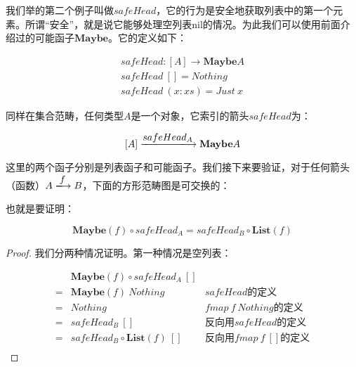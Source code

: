 \documentclass{article}
\begin{document}
\begin{example}
我们举的第二个例子叫做$safeHead$，它的行为是安全地获取列表中的第一个元素。所谓“安全”，就是说它能够处理空列表nil的情况。为此我们可以使用前面介绍过的可能函子$\mathbf{Maybe}$。它的定义如下：

\[
\begin{array}{l}
safeHead : [A] \to \mathbf{Maybe} A \\
safeHead\ [] = Nothing \\
safeHead\ (x:xs) = Just\ x
\end{array}
\]

同样在集合范畴，任何类型$A$是一个对象，它索引的箭头$safeHead$为：

\[
[A] \arrowto{safeHead_A} \mathbf{Maybe} A
\]

这里的两个函子分别是列表函子和可能函子。我们接下来要验证，对于任何箭头（函数）$A \arrowto{f} B$，下面的方形范畴图是可交换的：

\begin{center}
\end{center}

也就是要证明：

\[
  \mathbf{Maybe}(f) \circ safeHead_A = safeHead_B \circ \mathbf{List}(f)
\]

\begin{proof}
我们分两种情况证明。第一种情况是空列表：

\[
\begin{array}{cll}
  & \mathbf{Maybe}(f) \circ safeHead_A\ [] & \\
= & \mathbf{Maybe}(f)\ Nothing & \text{$safeHead$的定义} \\
= & Nothing & \text{$fmap\ f\ Nothing$的定义} \\
= & safeHead_B\ [] & \text{反向用$safeHead$的定义} \\
= & safeHead_B \circ \mathbf{List}(f)\ [] & \text{反向用$fmap\ f\ []$的定义} \\
\end{array}
\]


\end{proof}
\end{example}
\end{document}
